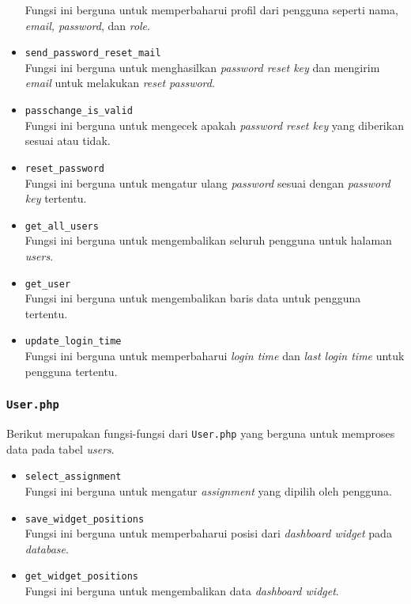\begin{itemize}
	Fungsi ini berguna untuk memperbaharui profil dari pengguna seperti nama, \textit{email, password}, dan \textit{role}.
	\item \texttt{send\_password\_reset\_mail}\\
	Fungsi ini berguna untuk menghasilkan \textit{password reset key} dan mengirim \textit{email} untuk melakukan \textit{reset password}.
	\item \texttt{passchange\_is\_valid}\\
	Fungsi ini berguna untuk mengecek apakah \textit{password reset key} yang diberikan sesuai atau tidak.
	\item \texttt{reset\_password}\\
	Fungsi ini berguna untuk mengatur ulang \textit{password} sesuai dengan \textit{password key} tertentu.
	\item \texttt{get\_all\_users}\\
	Fungsi ini berguna untuk mengembalikan seluruh pengguna untuk halaman \textit{users}.
	\item \texttt{get\_user}\\
	Fungsi ini berguna untuk mengembalikan baris data untuk pengguna tertentu.
	\item \texttt{update\_login\_time}\\
	Fungsi ini berguna untuk memperbaharui \textit{login time} dan \textit{last login time} untuk pengguna tertentu.
\end{itemize}
\subsubsection{\texttt{User.php}}
Berikut merupakan fungsi-fungsi dari \texttt{User.php} yang berguna untuk memproses data pada tabel \textit{users}.
\begin{itemize}
	\item \texttt{select\_assignment}\\
	Fungsi ini berguna untuk mengatur \textit{assignment} yang dipilih oleh pengguna.
	\item \texttt{save\_widget\_positions}\\
	Fungsi ini berguna untuk memperbaharui posisi dari \textit{dashboard widget} pada \textit{database}.
	\item \texttt{get\_widget\_positions}\\
	Fungsi ini berguna untuk mengembalikan data \textit{dashboard widget}.
\end{itemize}


